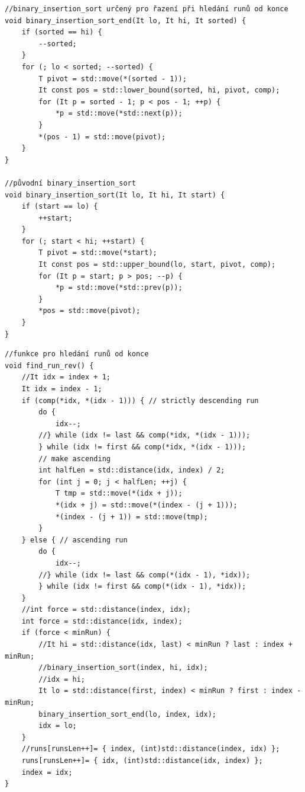 \documentclass[thesis=B,czech]{FITthesis}[2019/12/23]
\begin{document}
\begin{verbatim}
//binary_insertion_sort určený pro řazení při hledání runů od konce
void binary_insertion_sort_end(It lo, It hi, It sorted) {
    if (sorted == hi) {
        --sorted;
    }
    for (; lo < sorted; --sorted) {
        T pivot = std::move(*(sorted - 1));
        It const pos = std::lower_bound(sorted, hi, pivot, comp);
        for (It p = sorted - 1; p < pos - 1; ++p) {
            *p = std::move(*std::next(p));
        }
        *(pos - 1) = std::move(pivot);
    }
}
    
//původní binary_insertion_sort
void binary_insertion_sort(It lo, It hi, It start) {
    if (start == lo) {
        ++start;
    }
    for (; start < hi; ++start) {
        T pivot = std::move(*start);
        It const pos = std::upper_bound(lo, start, pivot, comp);
        for (It p = start; p > pos; --p) {
            *p = std::move(*std::prev(p));
        }
        *pos = std::move(pivot);
    }
}
\end{verbatim}

\begin{verbatim}
//funkce pro hledání runů od konce
void find_run_rev() {
 	//It idx = index + 1;
    It idx = index - 1;
    if (comp(*idx, *(idx - 1))) { // strictly descending run
        do {
            idx--;
        //} while (idx != last && comp(*idx, *(idx - 1)));
        } while (idx != first && comp(*idx, *(idx - 1)));
        // make ascending
        int halfLen = std::distance(idx, index) / 2;
        for (int j = 0; j < halfLen; ++j) {
            T tmp = std::move(*(idx + j));
            *(idx + j) = std::move(*(index - (j + 1)));
            *(index - (j + 1)) = std::move(tmp);
        }
    } else { // ascending run
        do {
            idx--;
        //} while (idx != last && comp(*(idx - 1), *idx));
        } while (idx != first && comp(*(idx - 1), *idx));
    }
    //int force = std::distance(index, idx);
    int force = std::distance(idx, index);
    if (force < minRun) {
        //It hi = std::distance(idx, last) < minRun ? last : index + minRun;
        //binary_insertion_sort(index, hi, idx);
        //idx = hi;
        It lo = std::distance(first, index) < minRun ? first : index - minRun;
        binary_insertion_sort_end(lo, index, idx);
        idx = lo;
    }
    //runs[runsLen++]= { index, (int)std::distance(index, idx) };
    runs[runsLen++]= { idx, (int)std::distance(idx, index) };
    index = idx;
}

\end{verbatim}
\end{document}

